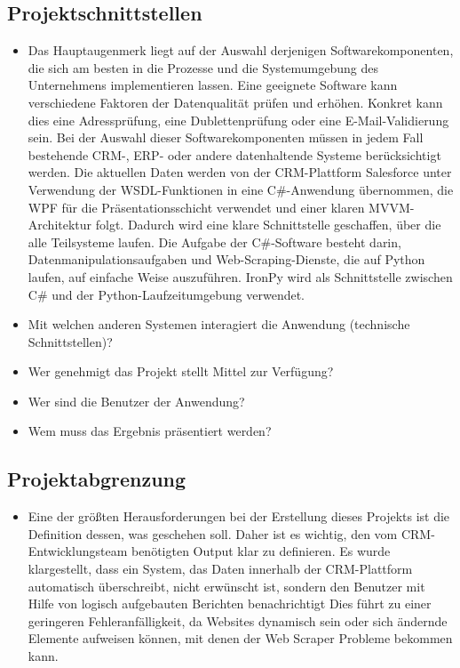 \subsection{Projektschnittstellen} 
\label{sec:Projektschnittstellen}
\begin{itemize}
	\item Das Hauptaugenmerk liegt auf der Auswahl derjenigen Softwarekomponenten, die sich am besten in die Prozesse und die Systemumgebung des Unternehmens implementieren lassen. 
	Eine geeignete Software kann verschiedene Faktoren der Datenqualität prüfen und erhöhen. Konkret kann dies eine Adressprüfung, eine Dublettenprüfung oder eine E-Mail-Validierung sein.
	Bei der Auswahl dieser Softwarekomponenten müssen in jedem Fall bestehende CRM-, ERP- oder andere datenhaltende Systeme berücksichtigt werden.
	Die aktuellen Daten werden von der CRM-Plattform Salesforce unter Verwendung der WSDL-Funktionen in eine C\#-Anwendung übernommen, die WPF für die Präsentationsschicht verwendet und einer klaren MVVM-Architektur folgt.
	Dadurch wird eine klare Schnittstelle geschaffen, über die alle Teilsysteme laufen.
	Die Aufgabe der C\#-Software besteht darin, Datenmanipulationsaufgaben und Web-Scraping-Dienste, die auf Python laufen, auf einfache Weise auszuführen. 
	IronPy wird als Schnittstelle zwischen C\# und der Python-Laufzeitumgebung verwendet.

	\item Mit welchen anderen Systemen interagiert die Anwendung (technische Schnittstellen)?
	\item Wer genehmigt das Projekt \bzw stellt Mittel zur Verfügung? 
	\item Wer sind die Benutzer der Anwendung?
	\item Wem muss das Ergebnis präsentiert werden?
\end{itemize}


\subsection{Projektabgrenzung} 
\label{sec:Projektabgrenzung}
\begin{itemize}
	\item Eine der größten Herausforderungen bei der Erstellung dieses Projekts ist die Definition dessen, was geschehen soll.
	Daher ist es wichtig, den vom CRM-Entwicklungsteam benötigten Output klar zu definieren. 
	Es wurde klargestellt, dass ein System, das Daten innerhalb der CRM-Plattform automatisch überschreibt, nicht erwünscht ist, sondern den Benutzer mit Hilfe von logisch aufgebauten Berichten benachrichtigt 
	Dies führt zu einer geringeren Fehleranfälligkeit, da Websites dynamisch sein oder sich ändernde Elemente aufweisen können, mit denen der Web Scraper Probleme bekommen kann.
\end{itemize}
